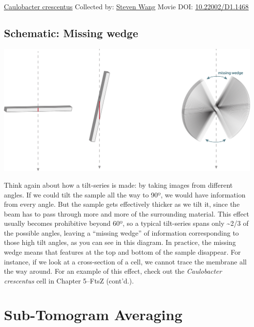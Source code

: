 \documentclass[]{tufte-book}
\begin{document}
\hypertarget{htmlwidget-698ae468f329acb7b797}{}

\label{fig:1-6}\protect\hyperlink{tree}{Caulobacter crescentus} Collected by: \protect\hyperlink{steven_wang}{Steven Wang} Movie DOI: \href{https://doi.org/10.22002/D1.1468}{10.22002/D1.1468}

\hypertarget{Missing_wedge}{%
\subsection*{Schematic: Missing wedge}\label{Missing_wedge}}

\includegraphics[width=20.83in]{img/schematics/1_6_1}

Think again about how a tilt-series is made: by taking images from different angles. If we could tilt the sample all the way to 90º, we would have information from every angle. But the sample gets effectively thicker as we tilt it, since the beam has to pass through more and more of the surrounding material. This effect usually becomes prohibitive beyond 60º, so a typical tilt-series spans only \textasciitilde{}2/3 of the possible angles, leaving a ``missing wedge'' of information corresponding to those high tilt angles, as you can see in this diagram. In practice, the missing wedge means that features at the top and bottom of the sample disappear. For instance, if we look at a cross-section of a cell, we cannot trace the membrane all the way around. For an example of this effect, check out the \emph{Caulobacter crescentus} cell in Chapter 5--FtsZ (cont'd.).

\hypertarget{sub-tomogram-averaging}{%
\section{Sub-Tomogram Averaging}\label{sub-tomogram-averaging}}
\end{document}
